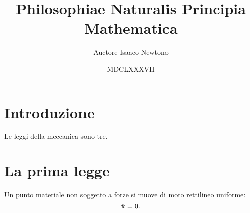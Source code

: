 \documentclass{article}
\title{Philosophiae Naturalis Principia Mathematica}
\author{Auctore Isaaco Newtono}
\date{MDCLXXXVII}
\begin{document}
\maketitle

\section{Introduzione}
Le leggi della meccanica sono tre.

\section{La prima legge}
Un punto materiale non soggetto a forze si muove di moto rettilineo uniforme:
\begin{equation}
	\ddot{\vb x} = 0.
\end{equation}
\end{document}
